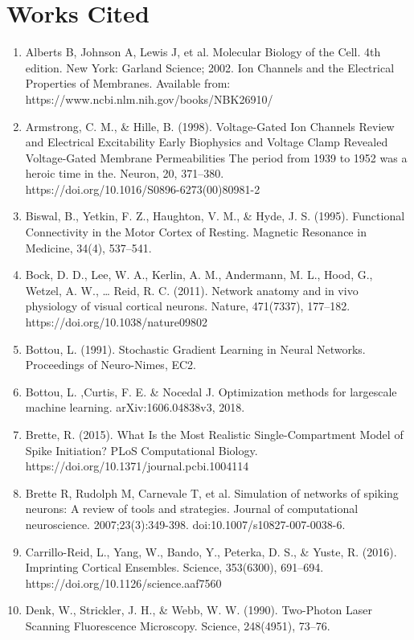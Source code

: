 \documentclass[11pt]{article}
\begin{document}
\section{Works Cited}


\begin{enumerate}
\item Alberts B, Johnson A, Lewis J, et al. Molecular Biology of the Cell. 4th edition. New York: Garland Science; 2002. Ion Channels and the Electrical Properties of Membranes. Available from: https://www.ncbi.nlm.nih.gov/books/NBK26910/
\item Armstrong, C. M., \& Hille, B. (1998). Voltage-Gated Ion Channels Review and Electrical Excitability Early Biophysics and Voltage Clamp Revealed Voltage-Gated Membrane Permeabilities The period from 1939 to 1952 was a heroic time in the. Neuron, 20, 371–380.\\ https://doi.org/10.1016/S0896-6273(00)80981-2
\item Biswal, B., Yetkin, F. Z., Haughton, V. M., \& Hyde, J. S. (1995). Functional Connectivity in the Motor Cortex of Resting. Magnetic Resonance in Medicine, 34(4), 537–541.
\item Bock, D. D., Lee, W. A., Kerlin, A. M., Andermann, M. L., Hood, G., Wetzel, A. W., … Reid, R. C. (2011). Network anatomy and in vivo physiology of visual cortical neurons. Nature, 471(7337), 177–182. https://doi.org/10.1038/nature09802
\item Bottou, L. (1991). Stochastic Gradient Learning in Neural Networks. Proceedings of Neuro-Nimes, EC2.
\item Bottou, L. ,Curtis, F. E. \& Nocedal J. Optimization methods for largescale
machine learning. arXiv:1606.04838v3, 2018.
\item Brette, R. (2015). What Is the Most Realistic Single-Compartment Model of Spike Initiation? PLoS Computational Biology. https://doi.org/10.1371/journal.pcbi.1004114
\item Brette R, Rudolph M, Carnevale T, et al. Simulation of networks of spiking neurons: A review of tools and strategies. Journal of computational neuroscience. 2007;23(3):349-398. doi:10.1007/s10827-007-0038-6.
\item Carrillo-Reid, L., Yang, W., Bando, Y., Peterka, D. S., \& Yuste, R. (2016). Imprinting Cortical Ensembles. Science, 353(6300), 691–694. https://doi.org/10.1126/science.aaf7560
\item Denk, W., Strickler, J. H., \& Webb, W. W. (1990). Two-Photon Laser Scanning Fluorescence Microscopy. Science, 248(4951), 73–76.

\end{enumerate}
\end{document}

